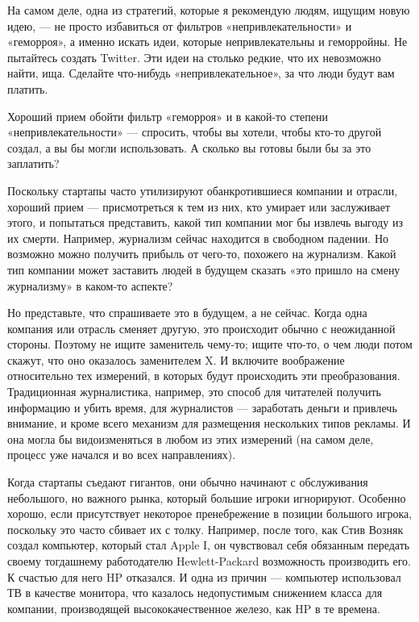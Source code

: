 \documentclass[ebook,12pt,oneside,openany]{memoir}
\begin{document}
На самом деле, одна из стратегий, которые я рекомендую людям, ищущим
новую идею, — не просто избавиться от фильтров «непривлекательности» и
«геморроя», а именно искать идеи, которые непривлекательны и
геморройны. Не пытайтесь создать Twitter. Эти идеи на столько редкие,
что их невозможно найти, ища. Сделайте что-нибудь «непривлекательное»,
за что люди будут вам платить.

Хороший прием обойти фильтр «геморроя» и в какой-то степени
«непривлекательности» — спросить, чтобы вы хотели, чтобы кто-то другой
создал, а вы бы могли использовать. А сколько вы готовы были бы за это
заплатить?

Поскольку стартапы часто утилизируют обанкротившиеся компании и
отрасли, хороший прием — присмотреться к тем из них, кто умирает или
заслуживает этого, и попытаться представить, какой тип компании мог бы
извлечь выгоду из их смерти. Например, журнализм сейчас находится в
свободном падении. Но возможно можно получить прибыль от чего-то,
похожего на журнализм. Какой тип компании может заставить людей в
будущем сказать «это пришло на смену журнализму» в каком-то аспекте?

Но представьте, что спрашиваете это в будущем, а не сейчас. Когда одна
компания или отрасль сменяет другую, это происходит обычно с
неожиданной стороны. Поэтому не ищите заменитель чему-то; ищите
что-то, о чем люди потом скажут, что оно оказалось заменителем X. И
включите воображение относительно тех измерений, в которых будут
происходить эти преобразования. Традиционная журналистика, например,
это способ для читателей получить информацию и убить время, для
журналистов — заработать деньги и привлечь внимание, и кроме всего
механизм для размещения нескольких типов рекламы. И она могла бы
видоизменяться в любом из этих измерений (на самом деле, процесс уже
начался и во всех направлениях).

Когда стартапы съедают гигантов, они обычно начинают с обслуживания
небольшого, но важного рынка, который большие игроки игнорируют.
Особенно хорошо, если присутствует некоторое пренебрежение в позиции
большого игрока, поскольку это часто сбивает их с толку. Например,
после того, как Стив Возняк создал компьютер, который стал Apple I, он
чувствовал себя обязанным передать своему тогдашнему работодателю
Hewlett-Packard возможность производить его. К счастью для него HP
отказался. И одна из причин — компьютер использовал ТВ в качестве
монитора, что казалось недопустимым снижением класса для компании,
производящей высококачественное железо, как HP в те времена.
\end{document}

